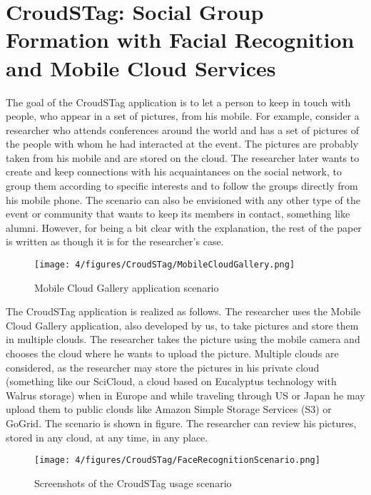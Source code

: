
\section{CroudSTag: Social Group Formation with Facial Recognition and Mobile Cloud Services}
The goal of the CroudSTag application is to let a person to keep in touch with people, who appear in a set of pictures, from his mobile. For example, consider a researcher who attends conferences around the world and has a set of pictures of the people with whom he had interacted at the event. The pictures are probably taken from his mobile and are stored on the cloud. The researcher later wants to create and keep connections with his acquaintances on the social network, to group them according to specific interests and to follow the groups directly from his mobile phone. The scenario can also be envisioned with any other type of the event or community that wants to keep its members in contact, something like alumni. However, for being a bit clear with the explanation, the rest of the paper is written as though it is for the researcher's case.

\begin{figure}
\centering
\texttt{[image: 4/figures/CroudSTag/MobileCloudGallery.png]}
\caption{Mobile Cloud Gallery application scenario}
\label{fig:MobileCloudGallery}
\end{figure}

The CroudSTag application is realized as follows. The researcher uses the Mobile Cloud Gallery application, also developed by us, to take pictures and store them in multiple clouds. The researcher takes the picture using the mobile camera and chooses the cloud where he wants to upload the picture. Multiple clouds are considered, as the researcher may store the pictures in his private cloud (something like our SciCloud, a cloud based on Eucalyptus technology with Walrus storage) when in Europe and while traveling through US or Japan he may upload them to public clouds like Amazon Simple Storage Services (S3) or GoGrid. The scenario is shown in figure. The researcher can review his pictures, stored in any cloud, at any time, in any place.

\begin{figure}
\centering
\texttt{[image: 4/figures/CroudSTag/FaceRecognitionScenario.png]}
\caption{Screenshots of the CroudSTag usage scenario}
\label{fig:FaceRecognitionScenario}
\end{figure}

